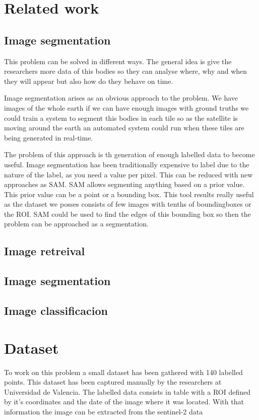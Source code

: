 \documentclass[conference]{IEEEtran}
\begin{document}
    \section{Related work}


    \subsection*{Image segmentation}
    This problem can be solved in different ways. The general idea is give the researchers more data
    of this bodies so they can analyse where, why and when they will appear but also how do they
    behave on time.

    Image segmentation arises as an obvious approach to the problem. We have images of the whole earth
    if we can have enough images with ground truths we could train a system to segment this bodies in
    each tile so as the satellite is moving around the earth an automated system could run when these
    tiles are being generated in real-time.

    The problem of this approach is th generation of enough labelled data to become useful.
    Image segmentation has been traditionally expensive to label due to the nature of the label, as
    you need a value per pixel.
    This can be reduced with new approaches as SAM. SAM allows segmenting anything based on a prior
    value. This prior value can be a point or a bounding box. This tool results really useful as
    the dataset we posses consists of few images with tenths of boundingboxes or the ROI.
    SAM could be used to find the edges of this bounding box so then the problem can be approached
    as a segmentation.

    \subsection{Image retreival}

    \subsection{Image segmentation}

    \subsection{Image classificacion}


    \section{Dataset}
    To work on this problem a small dataset has been gathered with 140 labelled points.
    This dataset has been captured manually by the researchers at Universidad de Valencia.
    The labelled data consists in table with a ROI defined by it's coordinates and the date
    of the image where it was located.
    With that information the image can be extracted from the sentinel-2 data
\end{document}
